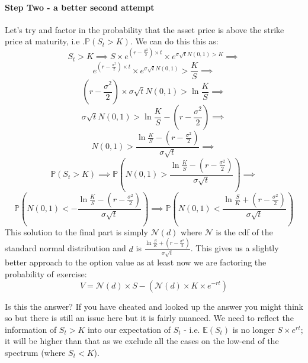 \documentclass[../../Axiomathic.tex]{subfiles}
\begin{document}
\paragraph{Step Two - a better second attempt}
Let's try and factor in the probability that the asset price is above the strike price at maturity, i.e .$\mathbb{P}(S_t>K)$. We can do this this as:
\[S_t>K \implies S \times e^{(r-\frac{\sigma^2}{2}) \times t} \times e^{\sigma \sqrt t N(0,1)>K} \implies \]
\[e^{(r-\frac{\sigma^2}{2}) \times t} \times e^{\sigma \sqrt t N(0,1)} > \frac{K}{S}\implies \]
\[(r-\frac{\sigma^2}{2}) \times \sigma \sqrt t N(0,1) > \ln{\frac{K}{S}} \implies \]
\[ \sigma \sqrt t N(0,1) > \ln{\frac{K}{S}}-(r-\frac{\sigma^2}{2}) \implies \]
\[ N(0,1) > \frac{\ln{\frac{K}{S}}-(r-\frac{\sigma^2}{2})}{\sigma \sqrt t } \implies \]
\[\mathbb{P}(S_t>K) \implies \mathbb{P}(N(0,1) > \frac{\ln{\frac{K}{S}}-(r-\frac{\sigma^2}{2})}{\sigma \sqrt t })\implies \]
\[ \mathbb{P}(N(0,1) <- \frac{\ln{\frac{K}{S}}-(r-\frac{\sigma^2}{2})}{\sigma \sqrt t }) \implies \mathbb{P}(N(0,1) < \frac{\ln{\frac{S}{K}}+(r-\frac{\sigma^2}{2})}{\sigma \sqrt t }) \]
This solution to the final part is simply $\mathcal{N}(d)$ where $\mathcal{N}$ is the cdf of the standard normal distribution and $d$ is $\frac{\ln{\frac{S}{K}}+(r-\frac{\sigma^2}{2})}{\sigma \sqrt t }$. This gives us a slightly better approach to the option value as at least now we are factoring the probability of exercise:
\[V = \mathcal{N}(d)\times S -\left (\mathcal{N}(d) \times K\times e^{-rt} \right )\]

Is this the answer? If you have cheated and looked up the answer you might think so but there is still an issue here but it is fairly nuanced. We need to reflect the information of $S_t>K$ into our expectation of $S_t$ - i.e. $\mathbb{E}(S_t)$ is no longer $S \times e^{rt}$; it will be higher than that as we exclude all the cases on the low-end of the spectrum (where $S_t <K$). 
\end{document}
